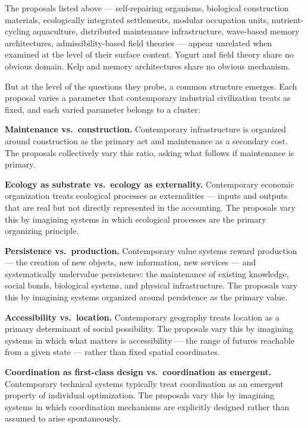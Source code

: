 \documentclass[12pt, a4paper]{article}
\theoremstyle{named}
\begin{document}
The proposals listed above — self-repairing organisms, biological
construction materials, ecologically integrated settlements, modular
occupation units, nutrient-cycling aquaculture, distributed maintenance
infrastructure, wave-based memory architectures, admissibility-based
field theories — appear unrelated when examined at the level of their
surface content. Yogurt and field theory share no obvious domain.
Kelp and memory architectures share no obvious mechanism.

But at the level of the questions they probe, a common structure
emerges. Each proposal varies a parameter that contemporary industrial
civilization treats as fixed, and each varied parameter belongs to a
cluster:

\medskip

\noindent\textbf{Maintenance vs.\ construction.} Contemporary
infrastructure is organized around construction as the primary act and
maintenance as a secondary cost. The proposals collectively vary this
ratio, asking what follows if maintenance is primary.

\medskip

\noindent\textbf{Ecology as substrate vs.\ ecology as externality.}
Contemporary economic organization treats ecological processes as
externalities — inputs and outputs that are real but not directly
represented in the accounting. The proposals vary this by imagining
systems in which ecological processes are the primary organizing
principle.

\medskip

\noindent\textbf{Persistence vs.\ production.} Contemporary value
systems reward production — the creation of new objects, new
information, new services — and systematically undervalue persistence:
the maintenance of existing knowledge, social bonds, biological systems,
and physical infrastructure. The proposals vary this by imagining systems
organized around persistence as the primary value.

\medskip

\noindent\textbf{Accessibility vs.\ location.} Contemporary geography
treats location as a primary determinant of social possibility. The
proposals vary this by imagining systems in which what matters is
accessibility — the range of futures reachable from a given state —
rather than fixed spatial coordinates.

\medskip

\noindent\textbf{Coordination as first-class design vs.\ coordination as
emergent.} Contemporary technical systems typically treat coordination
as an emergent property of individual optimization. The proposals vary
this by imagining systems in which coordination mechanisms are
explicitly designed rather than assumed to arise spontaneously.
\end{document}
